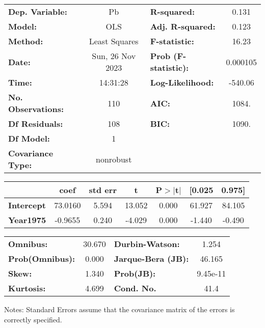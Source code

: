 \begin{center}
\begin{tabular}{lclc}
\toprule
\textbf{Dep. Variable:}    &        Pb        & \textbf{  R-squared:         } &     0.131   \\
\textbf{Model:}            &       OLS        & \textbf{  Adj. R-squared:    } &     0.123   \\
\textbf{Method:}           &  Least Squares   & \textbf{  F-statistic:       } &     16.23   \\
\textbf{Date:}             & Sun, 26 Nov 2023 & \textbf{  Prob (F-statistic):} &  0.000105   \\
\textbf{Time:}             &     14:31:28     & \textbf{  Log-Likelihood:    } &   -540.06   \\
\textbf{No. Observations:} &         110      & \textbf{  AIC:               } &     1084.   \\
\textbf{Df Residuals:}     &         108      & \textbf{  BIC:               } &     1090.   \\
\textbf{Df Model:}         &           1      & \textbf{                     } &             \\
\textbf{Covariance Type:}  &    nonrobust     & \textbf{                     } &             \\
\bottomrule
\end{tabular}
\begin{tabular}{lcccccc}
                   & \textbf{coef} & \textbf{std err} & \textbf{t} & \textbf{P$> |$t$|$} & \textbf{[0.025} & \textbf{0.975]}  \\
\midrule
\textbf{Intercept} &      73.0160  &        5.594     &    13.052  &         0.000        &       61.927    &       84.105     \\
\textbf{Year1975}  &      -0.9655  &        0.240     &    -4.029  &         0.000        &       -1.440    &       -0.490     \\
\bottomrule
\end{tabular}
\begin{tabular}{lclc}
\textbf{Omnibus:}       & 30.670 & \textbf{  Durbin-Watson:     } &    1.254  \\
\textbf{Prob(Omnibus):} &  0.000 & \textbf{  Jarque-Bera (JB):  } &   46.165  \\
\textbf{Skew:}          &  1.340 & \textbf{  Prob(JB):          } & 9.45e-11  \\
\textbf{Kurtosis:}      &  4.699 & \textbf{  Cond. No.          } &     41.4  \\
\bottomrule
\end{tabular}
\end{center}

Notes: \newline
 [1] Standard Errors assume that the covariance matrix of the errors is correctly specified.